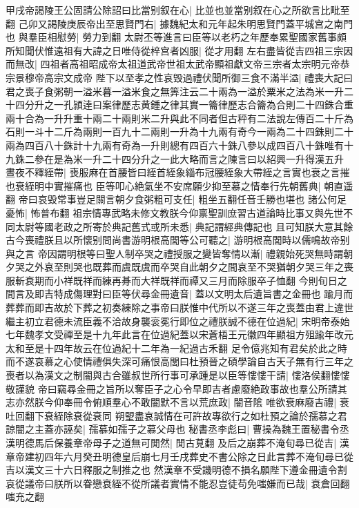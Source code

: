 甲戌帝謁陵王公固請公除詔曰比當别叙在心|{
	比並也並當别叙在心之所欲言比毗至翻}
己卯又謁陵庚辰帝出至思賢門右|{
	據魏紀太和元年起朱明思賢門蓋平城宫之南門也}
與羣臣相慰勞|{
	勞力到翻}
太尉丕等進言曰臣等以老朽之年歷奉累聖國家舊事頗所知聞伏惟遠祖有大諱之日唯侍從梓宫者凶服|{
	從才用翻}
左右盡皆從吉四祖三宗因而無改|{
	四祖者高祖昭成帝太祖道武帝世祖太武帝顯祖獻文帝三宗者太宗明元帝恭宗景穆帝高宗文成帝}
陛下以至孝之性哀毁過禮伏聞所御三食不滿半溢|{
	禮喪大記曰君之喪子食粥朝一溢米暮一溢米食之無筭注云二十兩為一溢於粟米之法為米一升二十四分升之一孔頴逹曰案律歷志黄鍾之律其實一籥律歷志合籥為合則二十四銖合重兩十合為一升升重十兩二十兩則米二升與此不同者但古秤有二法說左傳百二十斤為石則一斗十二斤為兩則一百九十二兩則一升為十九兩有奇今一兩為二十四銖則二十兩為四百八十銖計十九兩有奇為一升則總有四百六十銖八參以成四百八十銖唯有十九銖二參在是為米一升二十四分升之一此大略而言之陳言曰以紹興一升得漢五升}
晝夜不釋絰帶|{
	喪服麻在首腰皆曰絰首絰象緇布冠腰絰象大帶絰之言實也衰之言摧也衰絰明中實摧痛也}
臣等叩心絶氣坐不安席願少抑至慕之情奉行先朝舊典|{
	朝直遥翻}
帝曰哀毁常事豈足關言朝夕食粥粗可支任|{
	粗坐五翻任音壬勝也堪也}
諸公何足憂怖|{
	怖普布翻}
祖宗情專武略未修文教朕今仰禀聖訓庶習古道論時比事又與先世不同太尉等國老政之所寄於典記舊式或所未悉|{
	典記謂經典傳記也}
且可知朕大意其餘古今喪禮朕且以所懷别問尚書游明根高閭等公可聽之|{
	游明根高閭時以儒鳴故帝别與之言}
帝因謂明根等曰聖人制卒哭之禮授服之變皆奪情以漸|{
	禮親始死哭無時謂朝夕哭之外哀至則哭也既葬而虞既虞而卒哭自此朝夕之間哀至不哭猶朝夕哭三年之喪服斬衰期而小祥既祥而練再朞而大祥既祥而禫又三月而除服卒子恤翻}
今則旬日之間言及即吉特成傷理對曰臣等伏尋金冊遺音|{
	蓋以文明太后遺旨書之金冊也}
踰月而葬葬而即吉故於下葬之初奏練除之事帝曰朕惟中代所以不遂三年之喪蓋由君上違世繼主初立君德未流臣義不洽故身襲衮冕行即位之禮朕誠不德在位過紀|{
	宋明帝泰始七年魏孝文受禪至是十九年此言在位過紀蓋以宋蒼梧王元徽四年顯祖方殂踰年改元太和至是十四年故云在位過紀十二年為一紀過古禾翻}
足令億兆知有君矣於此之時而不遂哀慕之心使情禮俱失深可痛恨高閭曰杜預晉之碩學論自古天子無有行三年之喪者以為漢文之制闇與古合雖叔世所行事可承踵是以臣等慺慺干請|{
	慺洛侯翻慺慺敬謹貌}
帝曰竊尋金冊之旨所以奪臣子之心令早即吉者慮廢絶政事故也羣公所請其志亦然朕今仰奉冊令俯順羣心不敢闇默不言以荒庶政|{
	闇音隂}
唯欲衰麻廢吉禮|{
	衰吐回翻下衰絰除衰從衰同}
朔朢盡哀誠情在可許故專欲行之如杜預之論於孺慕之君諒闇之主蓋亦誣矣|{
	孺慕如孺子之慕父母也}
秘書丞李彪曰|{
	曹操為魏王置秘書令丞}
漢明德馬后保養章帝母子之道無可閒然|{
	閒古莧翻}
及后之崩葬不淹旬尋已從吉|{
	漢章帝建初四年六月癸丑明德皇后崩七月壬戌葬史不書公除之日此言葬不淹旬尋已從吉以漢文三十六日釋服之制推之也}
然漢章不受譏明德不損名願陛下遵金冊遺令割哀從議帝曰朕所以眷戀衰絰不從所議者實情不能忍豈徒苟免嗤嫌而已哉|{
	衰倉回翻嗤充之翻}
